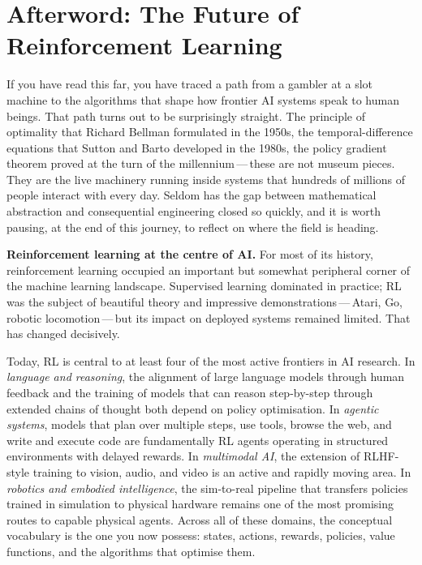 \chapter*{Afterword: The Future of Reinforcement Learning}

If you have read this far, you have traced a path from a gambler at a slot machine to the
algorithms that shape how frontier AI systems speak to human beings.  That path turns out to
be surprisingly straight.  The principle of optimality that Richard Bellman formulated in the
1950s, the temporal-difference equations that Sutton and Barto developed in the 1980s, the
policy gradient theorem proved at the turn of the millennium\,---\,these are not museum
pieces.  They are the live machinery running inside systems that hundreds of millions of
people interact with every day.  Seldom has the gap between mathematical abstraction and
consequential engineering closed so quickly, and it is worth pausing, at the end of this
journey, to reflect on where the field is heading.

\medskip

\textbf{Reinforcement learning at the centre of AI.}\quad
For most of its history, reinforcement learning occupied an important but somewhat
peripheral corner of the machine learning landscape.  Supervised learning dominated in
practice; RL was the subject of beautiful theory and impressive demonstrations\,---\,Atari,
Go, robotic locomotion\,---\,but its impact on deployed systems remained limited.  That has
changed decisively.

Today, RL is central to at least four of the most active frontiers in AI research.  In
\emph{language and reasoning}, the alignment of large language models through human feedback
and the training of models that can reason step-by-step through extended chains of thought
both depend on policy optimisation.  In \emph{agentic systems}, models that plan over
multiple steps, use tools, browse the web, and write and execute code are fundamentally RL
agents operating in structured environments with delayed rewards.  In \emph{multimodal AI},
the extension of RLHF-style training to vision, audio, and video is an active and rapidly
moving area.  In \emph{robotics and embodied intelligence}, the sim-to-real pipeline that
transfers policies trained in simulation to physical hardware remains one of the most
promising routes to capable physical agents.  Across all of these domains, the conceptual
vocabulary is the one you now possess: states, actions, rewards, policies, value functions,
and the algorithms that optimise them.

